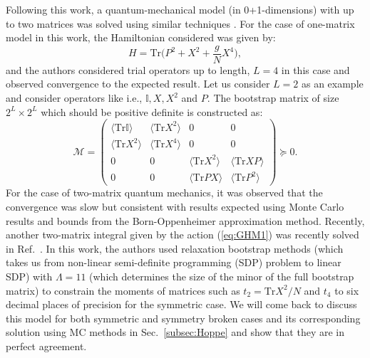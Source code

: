 \documentclass[letter,11pt]{article}
\begin{document}
Following this work, a quantum-mechanical 
model (in 0+1-dimensions) with up to two matrices was solved using similar techniques \cite{Han:2020bkb}.  
For the case of one-matrix model in this work, the Hamiltonian considered was given by:
\begin{equation}
H = \mbox{Tr} \Big( P^2 + X^2 + \frac{g}{N} X^4 \Big),
\end{equation}
and the authors considered trial operators up to length, $L = 4$ in this case 
and observed convergence to the expected result. 
Let us consider $L=2$ as an example and consider operators like 
i.e., $\mathbb{I}, X, X^{2}$ and $P$. The bootstrap matrix
of size $2^L \times 2^L$ 
which should be positive definite is constructed as:
\begin{equation}
	\mathcal{M} = 
	\begin{pmatrix}
		\langle \mbox{Tr}\mathbb{I} \rangle & \langle \mbox{Tr} X^2 \rangle & 0 & 0 \\
		\langle \mbox{Tr} X^2 \rangle & \langle \mbox{Tr} X^4 \rangle  & 0 & 0 \\ 
		0 & 0 & \langle \mbox{Tr} X^2 \rangle & \langle \mbox{Tr} XP \rangle \\
		0 & 0  & \langle \mbox{Tr} PX \rangle & \langle \mbox{Tr} P^2 \rangle
	\end{pmatrix}  \succeq 0. 
\end{equation}
For the case of two-matrix quantum mechanics, it was observed that the convergence
was slow but consistent with results expected using Monte Carlo results and bounds from the Born-Oppenheimer approximation method. Recently, another two-matrix integral given by the action (\ref{eq:GHM1}) was recently solved in Ref.~\cite{Kazakov:2021lel}. 
In this work, the authors used relaxation bootstrap methods (which takes us 
from non-linear semi-definite programming (SDP) problem to linear SDP) with
$\Lambda=11$ (which determines the size of the minor of the full bootstrap matrix) 
to constrain the moments of matrices such as $t_{2} = \mathrm{Tr}X^2/N$ and $t_{4}$ 
to six decimal places of precision for the symmetric case. We will come back to 
discuss this model for both symmetric and symmetry broken cases 
and its corresponding solution using MC methods in Sec.~\ref{subsec:Hoppe} 
and show that they are in perfect agreement.  
\end{document}

